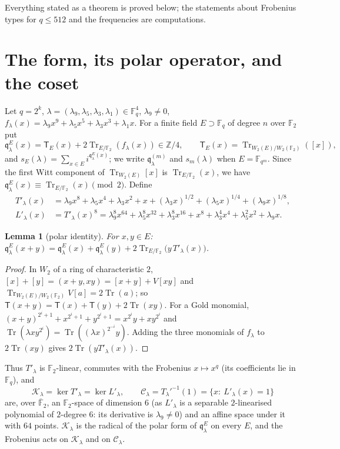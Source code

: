 \documentclass[12pt,a4paper]{amsart}
\newtheorem{lemma}[theorem]{Lemma}
\theoremstyle{definition}
\newcommand{\F}{\mathbb{F}}
\newcommand{\Z}{\mathbb{Z}}
\newcommand{\Tr}{\operatorname{Tr}}
\newcommand{\Kk}{\mathcal{K}}
\newcommand{\Cc}{\mathcal{C}}
\newcommand{\qq}{\mathfrak{q}}
\newcommand{\Tw}{\mathsf{T}}
\newcommand{\Fq}{\F_{q}}
\begin{document}
Everything stated as a theorem is proved below; the statements about Frobenius types for $q\le512$ and the frequencies are computations.

\section{The form, its polar operator, and the coset}\label{sec:form}

Let $q=2^k$, $\lambda=(\lambda_9,\lambda_5,\lambda_3,\lambda_1)\in\Fq^4$, $\lambda_9\ne0$, $f_\lambda(x)=\lambda_9x^9+\lambda_5x^5+\lambda_3x^3+\lambda_1x$. For a finite field $E\supset\Fq$ of degree $n$ over $\F_2$ put
\[
\qq^{E}_\lambda(x)=\Tw_E(x)+2\Tr_{E/\F_2}(f_\lambda(x))\in\Z/4,\qquad \Tw_E(x)=\Tr_{W_2(E)/W_2(\F_2)}([x]),
\]
and $s_E(\lambda)=\sum_{x\in E}i^{\qq^E_\lambda(x)}$; we write $\qq^{(m)}_\lambda$ and $s_m(\lambda)$ when $E=\F_{q^m}$. Since the first Witt component of $\Tr_{W_2(E)}[x]$ is $\Tr_{E/\F_2}(x)$, we have $\qq^E_\lambda(x)\equiv\Tr_{E/\F_2}(x)\pmod 2$. Define
\begin{align}
T'_\lambda(x)&=\lambda_9x^8+\lambda_5x^4+\lambda_3x^2+x+(\lambda_3x)^{1/2}+(\lambda_5x)^{1/4}+(\lambda_9x)^{1/8},\label{eq:Tp}\\
L'_\lambda(x)&=T'_\lambda(x)^8=\lambda_9^8x^{64}+\lambda_5^8x^{32}+\lambda_3^8x^{16}+x^8+\lambda_3^4x^4+\lambda_5^2x^2+\lambda_9x.\label{eq:Lp}
\end{align}

\begin{lemma}[polar identity]\label{lem:polar}
For $x,y\in E$: $\qq^E_\lambda(x+y)=\qq^E_\lambda(x)+\qq^E_\lambda(y)+2\Tr_{E/\F_2}\bigl(y\,T'_\lambda(x)\bigr)$.
\end{lemma}
\begin{proof}
In $W_2$ of a ring of characteristic $2$, $[x]+[y]=(x+y,xy)=[x+y]+V[xy]$ and $\Tr_{W_2(E)/W_2(\F_2)}V[a]=2\Tr(a)$; so $\Tw(x+y)=\Tw(x)+\Tw(y)+2\Tr(xy)$. For a Gold monomial, $(x+y)^{2^i+1}+x^{2^i+1}+y^{2^i+1}=x^{2^i}y+xy^{2^i}$ and $\Tr(\lambda xy^{2^i})=\Tr((\lambda x)^{2^{-i}}y)$. Adding the three monomials of $f_\lambda$ to $2\Tr(xy)$ gives $2\Tr(yT'_\lambda(x))$.
\end{proof}

Thus $T'_\lambda$ is $\F_2$-linear, commutes with the Frobenius $x\mapsto x^q$ (its coefficients lie in $\Fq$), and
\[
\Kk_\lambda=\ker T'_\lambda=\ker L'_\lambda,\qquad \Cc_\lambda=T_\lambda'^{-1}(1)=\{x:\ L'_\lambda(x)=1\}
\]
are, over $\overline{\F}_2$, an $\F_2$-space of dimension $6$ (as $L'_\lambda$ is a separable $2$-linearised polynomial of $2$-degree $6$: its derivative is $\lambda_9\ne0$) and an affine space under it with $64$ points. $\Kk_\lambda$ is the radical of the polar form of $\qq^E_\lambda$ on every $E$, and the Frobenius acts on $\Kk_\lambda$ and on $\Cc_\lambda$.
\end{document}
